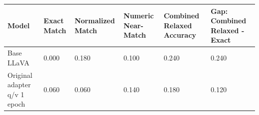 \begin{tabular}{llllll}
\toprule
Model & Exact Match & Normalized Match & Numeric Near-Match & Combined Relaxed Accuracy & Gap: Combined Relaxed - Exact \\
\midrule
Base LLaVA & 0.000 & 0.180 & 0.100 & 0.240 & 0.240 \\
Original adapter q/v 1 epoch & 0.060 & 0.060 & 0.140 & 0.180 & 0.120 \\
\bottomrule
\end{tabular}
